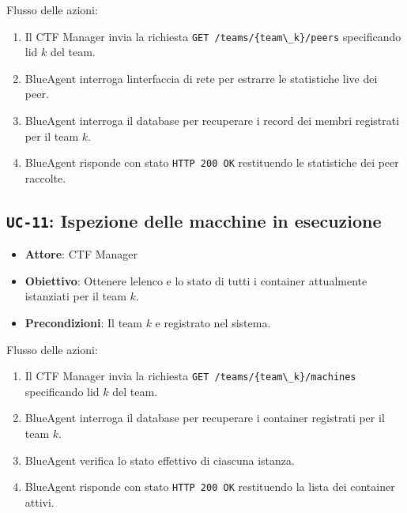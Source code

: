 Flusso delle azioni:

\begin{enumerate}
\def\labelenumi{\arabic{enumi}.}
\tightlist
\item
  Il CTF Manager invia la richiesta
  \passthrough{\lstinline!GET /teams/\{team\_k\}/peers!} specificando
  l\textquotesingle id \(k\) del team.
\item
  BlueAgent interroga l\textquotesingle interfaccia di rete per estrarre
  le statistiche live dei peer.
\item
  BlueAgent interroga il database per recuperare i record dei membri
  registrati per il team \(k\).
\item
  BlueAgent risponde con stato \passthrough{\lstinline!HTTP 200 OK!}
  restituendo le statistiche dei peer raccolte.
\end{enumerate}

\subsection{\texorpdfstring{\texttt{UC-11}: Ispezione delle macchine in
esecuzione}{UC-11: Ispezione delle macchine in esecuzione}}\label{uc-11-ispezione-delle-macchine-in-esecuzione}

\begin{itemize}
\tightlist
\item
  \textbf{Attore}: CTF Manager
\item
  \textbf{Obiettivo}: Ottenere l\textquotesingle elenco e lo stato di
  tutti i container attualmente istanziati per il team \(k\).
\item
  \textbf{Precondizioni}: Il team \(k\) e\textquotesingle{} registrato
  nel sistema.
\end{itemize}

Flusso delle azioni:

\begin{enumerate}
\def\labelenumi{\arabic{enumi}.}
\tightlist
\item
  Il CTF Manager invia la richiesta
  \passthrough{\lstinline!GET /teams/\{team\_k\}/machines!} specificando
  l\textquotesingle id \(k\) del team.
\item
  BlueAgent interroga il database per recuperare i container registrati
  per il team \(k\).
\item
  BlueAgent verifica lo stato effettivo di ciascuna istanza.
\item
  BlueAgent risponde con stato \passthrough{\lstinline!HTTP 200 OK!}
  restituendo la lista dei container attivi.
\end{enumerate}

